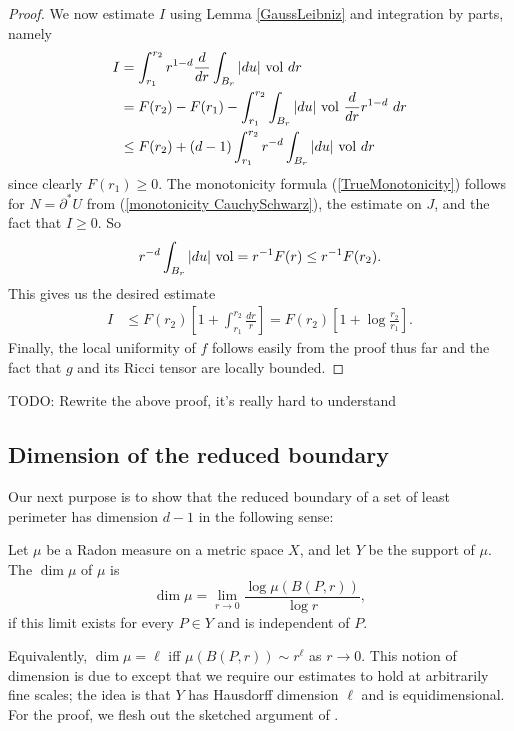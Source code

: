\begin{proof}
We now estimate $I$ using Lemma \ref{GaussLeibniz} and integration by parts, namely
\begin{align*}
I &= \int_{r_1}^{r_2} r^{1 - d} \frac{d}{dr} \int_{B_r} |du| ~\mathrm{vol} ~dr \\
&= F(r_2) - F(r_1) - \int_{r_1}^{r_2} \int_{B_r} |du| ~\mathrm{vol} ~\frac{d}{dr} r^{1 - d} ~dr\\
&\leq F(r_2) + (d - 1) \int_{r_1}^{r_2} r^{-d} \int_{B_r} |du| ~\mathrm{vol} ~dr
\end{align*}
since clearly $F(r_1) \geq 0$.
The monotonicity formula (\ref{TrueMonotonicity}) follows for $N = \partial^* U$ from (\ref{monotonicity CauchySchwarz}), the estimate on $J$, and the fact that $I \geq 0$.
So
$$r^{-d} \int_{B_r} |du| ~\mathrm{vol} = r^{-1} F(r) \leq r^{-1} F(r_2).$$
This gives us the desired estimate
\begin{align*}
I &\leq F(r_2)\left[1 + \int_{r_1}^{r_2} \frac{dr}{r}\right] = F(r_2)\left[1 + \log\frac{r_2}{r_1}\right].
\end{align*}
Finally, the local uniformity of $f$ follows easily from the proof thus far and the fact that $g$ and its Ricci tensor are locally bounded.
\end{proof}

TODO: Rewrite the above proof, it's really hard to understand



\subsection{Dimension of the reduced boundary}
Our next purpose is to show that the reduced boundary of a set of least perimeter has dimension $d - 1$ in the following sense:

\begin{definition}
Let $\mu$ be a Radon measure on a metric space $X$, and let $Y$ be the support of $\mu$.
The  $\dim \mu$ of $\mu$ is
$$\dim \mu = \lim_{r \to 0} \frac{\log \mu(B(P, r))}{\log r},$$
if this limit exists for every $P \in Y$ and is independent of $P$.
\end{definition}

Equivalently, $\dim \mu = \ell$ iff $\mu(B(P, r)) \sim r^\ell$ as $r \to 0$.
This notion of dimension is due to \cite[Definition 1.1]{bourgain18} except that we require our estimates to hold at arbitrarily fine scales; the idea is that $Y$ has Hausdorff dimension $\ell$ and is equidimensional.
For the proof, we flesh out the sketched argument of \cite[Theorem 12]{Mooney11}.

